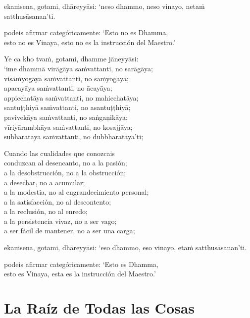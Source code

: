 ekaṁsena, gotami, dhāreyyāsi: ‘neso dhammo, neso vinayo, netaṁ satthusāsanan’ti.

\begin{english}
  podeis afirmar categóricamente: ‘Esto no es Dhamma,\\
  esto no es Vinaya, esto no es la instrucción del Maestro.’
\end{english}

Ye ca kho tvaṁ, gotami, dhamme jāneyyāsi:\\
‘ime dhammā virāgāya saṁvattanti, no sarāgāya;\\
visaṁyogāya saṁvattanti, no saṁyogāya;\\
apacayāya saṁvattanti, no ācayāya;\\
appicchatāya saṁvattanti, no mahicchatāya;\\
santuṭṭhiyā saṁvattanti, no asantuṭṭhiyā;\\
pavivekāya saṁvattanti, no saṅgaṇikāya;\\
vīriyārambhāya saṁvattanti, no kosajjāya;\\
subharatāya saṁvattanti, no dubbharatāyā’ti;

\begin{english}
  Cuando las cualidades que conozcais\\
  conduzcan al desencanto, no a la pasión;\\
  a la desobstrucción, no a la obstrucción;\\
  a desechar, no a acumular;\\
  a la modestia, no al engrandecimiento personal;\\
  a la satisfacción, no al descontento;\\
  a la reclusión, no al enredo;\\
  a la persistencia vivaz, no a ser vago;\\
  a ser fácil de mantener, no a ser una carga;
\end{english}

ekaṁsena, gotami, dhāreyyāsi: ‘eso dhammo, eso vinayo, etaṁ satthusāsanan’ti.

\begin{english}
  podeis afirmar categóricamente: ‘Esto es Dhamma,\\
  esto es Vinaya, esta es la instrucción del Maestro.’
\end{english}

\chapter{La Raíz de Todas las Cosas}

